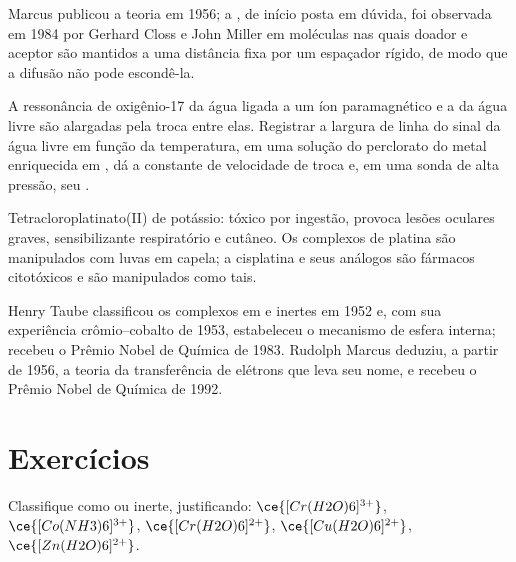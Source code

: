 Marcus publicou a teoria em 1956; a , de início posta em dúvida, foi
observada em 1984 por Gerhard Closs e John Miller em moléculas nas quais doador e
aceptor são mantidos a uma distância fixa por um espaçador rígido, de modo que a difusão
não pode escondê-la.

\begin{inthelab}
A ressonância de oxigênio-17 da água ligada a um íon paramagnético e a da água
livre são alargadas pela troca entre elas. Registrar a largura de linha do
sinal da água livre em função da temperatura, em uma solução do perclorato do metal
enriquecida em , dá a constante de velocidade de troca e, em uma sonda de alta pressão,
seu .
\end{inthelab}

\begin{safety}{}
Tetracloroplatinato(II) de potássio: tóxico por ingestão, provoca lesões oculares
graves, sensibilizante respiratório e cutâneo. Os complexos de platina são manipulados com
luvas em capela; a cisplatina e seus análogos são fármacos citotóxicos e são
manipulados como tais.
\end{safety}

\begin{history}
Henry Taube classificou os complexos em  e inertes em 1952 e, com sua
experiência crômio--cobalto de 1953, estabeleceu o mecanismo de esfera interna;
recebeu o Prêmio Nobel de Química de 1983. Rudolph Marcus deduziu, a partir de 1956, a
teoria da transferência de elétrons que leva seu nome, e recebeu o Prêmio Nobel de Química
de 1992.
\end{history}

\section{Exercícios}

\begin{exercise}[$\star$]\label{exo:b3:complex-mechanisms:1}
Classifique como  ou inerte, justificando: $\ce{[Cr(H2O)6]^{3+}}$, $\ce{[Co(NH3)6]^{3+}}$, $\ce{[Cr(H2O)6]^{2+}}$,
$\ce{[Cu(H2O)6]^{2+}}$, $\ce{[Zn(H2O)6]^{2+}}$.
\end{exercise}


